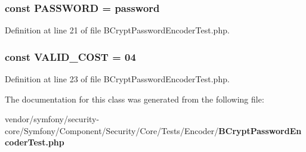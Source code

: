\subsubsection[{P\+A\+S\+S\+W\+O\+R\+D}]{\setlength{\rightskip}{0pt plus 5cm}const P\+A\+S\+S\+W\+O\+R\+D = \textquotesingle{}password\textquotesingle{}}\label{class_symfony_1_1_component_1_1_security_1_1_core_1_1_tests_1_1_encoder_1_1_b_crypt_password_encoder_test_a627633cf1f3c4ee60fcc7d025a4039ed}


Definition at line 21 of file B\+Crypt\+Password\+Encoder\+Test.\+php.

\subsubsection[{V\+A\+L\+I\+D\+\_\+\+C\+O\+S\+T}]{\setlength{\rightskip}{0pt plus 5cm}const V\+A\+L\+I\+D\+\_\+\+C\+O\+S\+T = \textquotesingle{}04\textquotesingle{}}\label{class_symfony_1_1_component_1_1_security_1_1_core_1_1_tests_1_1_encoder_1_1_b_crypt_password_encoder_test_a052c1e2b799081a76339d134c1b51b6d}


Definition at line 23 of file B\+Crypt\+Password\+Encoder\+Test.\+php.



The documentation for this class was generated from the following file\+:\begin{DoxyCompactItemize}
\item 
vendor/symfony/security-\/core/\+Symfony/\+Component/\+Security/\+Core/\+Tests/\+Encoder/{\bf B\+Crypt\+Password\+Encoder\+Test.\+php}\end{DoxyCompactItemize}
